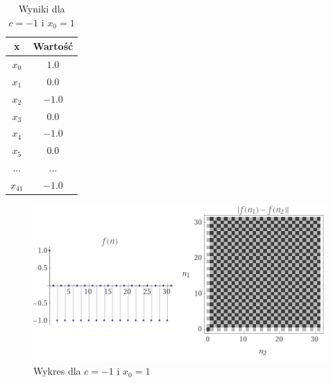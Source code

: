 \documentclass[a4paper,14pt]{report}
\begin{document}
    \begin{table}[H]
    \centering
    \begin{tabular}{|c | c |} 
     \hline
     x & Wartość \\ [0.5ex]
     \hline\hline
     $x_{0}$ & $1.0$ \\
     $x_{1}$ & $0.0$ \\
     $x_{2}$ & $-1.0$ \\
     $x_{3}$ & $0.0$ \\
     $x_{4}$ & $-1.0$  \\
     $x_{5}$ & $0.0$ \\
     ... & ... \\
     $x_{41}$ & $-1.0 $ \\
     \hline
    \end{tabular}
    \caption{Wyniki dla $c=-1$ i $x_{0}=1$}
    \label{Zad6d}
    \end{table}
    \begin{figure}[H]
      \includegraphics[scale=1.0]{wykresZad6d}
      \centering
      \caption{Wykres dla $c=-1$ i $x_{0}=1$}
    \end{figure}
\end{document}
